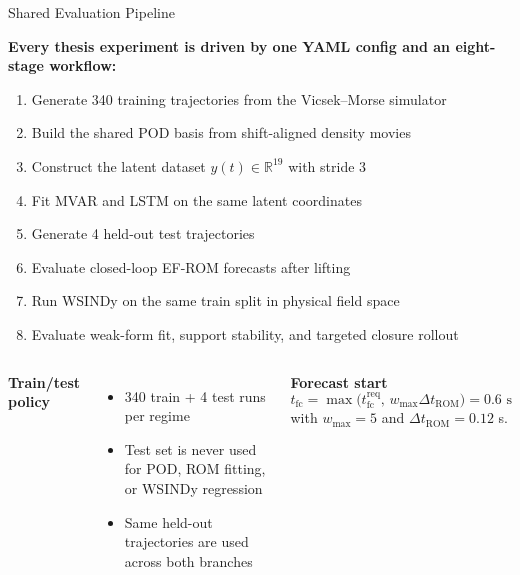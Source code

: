 
\iffalse
\begin{frame}[shrink=4]{Shared Evaluation Pipeline}

\textbf{Every thesis experiment is driven by one YAML config and an
eight-stage workflow:}

\begin{enumerate}
  \item Generate 340 training trajectories from the Vicsek--Morse simulator
  \item Build the shared POD basis from shift-aligned density movies
  \item Construct the latent dataset $y(t)\in\mathbb{R}^{19}$ with stride $3$
  \item Fit MVAR and LSTM on the same latent coordinates
  \item Generate 4 held-out test trajectories
  \item Evaluate closed-loop EF-ROM forecasts after lifting
  \item Run WSINDy on the same train split in physical field space
  \item Evaluate weak-form fit, support stability, and targeted closure rollout
\end{enumerate}

\medskip
\begin{columns}[T]
\textbf{Train/test policy}
\begin{itemize}
  \item 340 train + 4 test runs per regime
  \item Test set is never used for POD, ROM fitting, or WSINDy regression
  \item Same held-out trajectories are used across both branches
\end{itemize}

\textbf{Forecast start}
\[
  t_{\mathrm{fc}}
  =
  \max\!\bigl(t_{\mathrm{fc}}^{\mathrm{req}},\,w_{\max}\Delta t_{\mathrm{ROM}}\bigr)
  =
  0.6 \text{ s}
\]
with $w_{\max}=5$ and $\Delta t_{\mathrm{ROM}}=0.12$ s.
\end{columns}
\end{frame}

